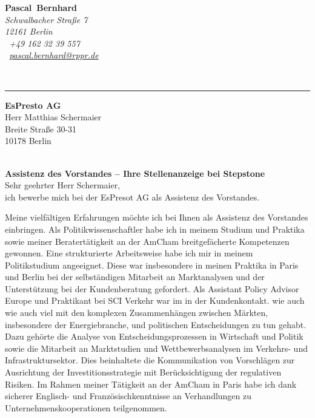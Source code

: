 \documentclass[11pt,a4paper]{article}
\def\firstname{Pascal}
\def\familyname{Bernhard}
\begin{document}
\sffamily   %
\hfill%
\begin{minipage}[t]{.6\textwidth}
	\raggedleft%
	{\bfseries {\color{firstnamecolor}\firstname}~{\color{familynamecolor}\familyname}}\\[.35ex]
	\small\itshape%
	Schwalbacher Straße 7\\
	12161 Berlin\\[.35ex]
	\Mobilefone~+49 162 32 39 557 \\
	\Letter~\href{mailto:pascal.bernhard@rppr.de}{pascal.bernhard@rppr.de}
\end{minipage}\\[0.5em]
%
{\color{firstnamecolor}\rule{\textwidth}{.25ex}}
%
\begin{minipage}[t]{.4\textwidth}
	\raggedright%
	\vspace*{1em}
	\textbf{EsPresto AG} \\
	Herr Matthias Schermaier \\[.35ex]
	\small%
	Breite Straße 30-31\\
	10178 Berlin
\end{minipage}
%
\hfill
%
\begin{minipage}[t]{.4\textwidth}
	\raggedleft %
\end{minipage}\\[1em]


{\bfseries \color{familynamecolor}Assistenz des Vorstandes -- Ihre Stellenanzeige bei Stepstone}\\[0.75em]

Sehr geehrter Herr Schermaier,\\[0.5em]
%
ich bewerbe mich bei der EsPresot AG als Assistenz des Vorstandes.

Meine vielfältigen Erfahrungen möchte ich bei Ihnen als Assistenz des Vorstandes einbringen. Als Politikwissenschaftler habe ich in meinem Studium und Praktika sowie meiner Beratertätigkeit an der AmCham breitgefächerte Kompetenzen gewonnen. Eine strukturierte Arbeitsweise habe ich mir in meinem Politikstudium angeeignet. Diese war insbesondere in meinen Praktika in Paris und Berlin bei der selbständigen Mitarbeit an Marktanalysen und der Unterstützung bei der Kundenberatung gefordert. Als Assistant Policy Advisor Europe und Praktikant bei SCI Verkehr war im in der Kundenkontakt. wie auch wie auch viel mit den komplexen Zusammen­hängen zwischen Märkten, insbesondere der Energiebranche, und politischen Entscheidungen zu tun gehabt. Dazu gehörte die Analyse von Entscheidungsprozessen in Wirtschaft und Politik sowie die Mitarbeit an Marktstudien und Wettbewerbsanalysen im Verkehrs- und Infrastruktursektor. Dies beinhaltete die Kommunikation von Vorschlägen zur Ausrichtung der Investitionsstrategie mit Berücksichtigung der regulativen Risiken. Im Rahmen meiner Tätigkeit an der AmCham in Paris habe ich dank sicherer Englisch- und Französischkenntnisse an Verhandlungen zu Unternehmenskooperationen teilgenommen. 
\end{document}
